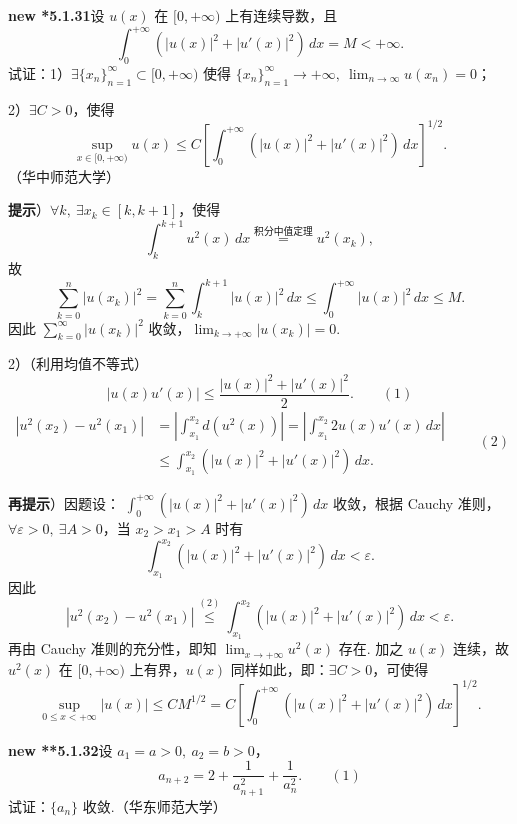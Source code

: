 \documentclass[UTF8,12pt,a4paper,fontset=fandol]{ctexart}
\begin{document}
\noindent\textbf{new *5.1.31}\quad 设 $u(x)$ 在 $[0,+\infty)$ 上有连续导数，且
\[
  \int_0^{+\infty}\left(|u(x)|^2+|u'(x)|^2\right)\,dx=M<+\infty.
\]
试证：1）$\exists\{x_n\}_{n=1}^{\infty}\subset[0,+\infty)$ 使得
$\{x_n\}_{n=1}^{\infty}\to+\infty,\ \lim_{n\to\infty}u(x_n)=0$；

2）$\exists C>0$，使得
\[
  \sup_{x\in[0,+\infty)}u(x)\le C\left[\int_0^{+\infty}\left(|u(x)|^2+|u'(x)|^2\right)\,dx\right]^{1/2}.
\]
（华中师范大学）

\noindent\textbf{提示}）$\forall k,\ \exists x_k\in[k,k+1]$，使得
\[
  \int_k^{k+1}u^2(x)\,dx
  \stackrel{\text{积分中值定理}}{=}u^2(x_k),
\]
故
\[
  \sum_{k=0}^n|u(x_k)|^2
  =\sum_{k=0}^n\int_k^{k+1}|u(x)|^2\,dx
  \le\int_0^{+\infty}|u(x)|^2\,dx\le M.
\]
因此 $\sum_{k=0}^{\infty}|u(x_k)|^2$ 收敛，$\lim_{k\to+\infty}|u(x_k)|=0$.

2）（利用均值不等式）
\[
  |u(x)u'(x)|\le\frac{|u(x)|^2+|u'(x)|^2}{2}.
\qquad(1)
\]
\begin{equation}
\begin{aligned}
|u^2(x_2)-u^2(x_1)|
&=\left|\int_{x_1}^{x_2}d(u^2(x))\right|
 =\left|\int_{x_1}^{x_2}2u(x)u'(x)\,dx\right|\\
&\le\int_{x_1}^{x_2}\left(|u(x)|^2+|u'(x)|^2\right)\,dx.
\end{aligned}
\qquad(2)
\end{equation}

\noindent\textbf{再提示}）因题设：
$\displaystyle\int_0^{+\infty}\left(|u(x)|^2+|u'(x)|^2\right)\,dx$ 收敛，根据 Cauchy 准则，
$\forall\varepsilon>0,\ \exists A>0$，当 $x_2>x_1>A$ 时有
\[
  \int_{x_1}^{x_2}\left(|u(x)|^2+|u'(x)|^2\right)\,dx<\varepsilon.
\]
因此
\[
  |u^2(x_2)-u^2(x_1)|\stackrel{(2)}{\le}
  \int_{x_1}^{x_2}\left(|u(x)|^2+|u'(x)|^2\right)\,dx<\varepsilon.
\]
再由 Cauchy 准则的充分性，即知 $\lim_{x\to+\infty}u^2(x)$ 存在. 加之 $u(x)$ 连续，故
$u^2(x)$ 在 $[0,+\infty)$ 上有界，$u(x)$ 同样如此，即：$\exists C>0$，可使得
\[
  \sup_{0\le x<+\infty}|u(x)|
  \le C M^{1/2}
  =C\left[\int_0^{+\infty}\left(|u(x)|^2+|u'(x)|^2\right)\,dx\right]^{1/2}.
\]

\noindent\textbf{new **5.1.32}\quad 设 $a_1=a>0,\ a_2=b>0$，
\[
  a_{n+2}=2+\frac1{a_{n+1}^2}+\frac1{a_n^2}.
\qquad(1)
\]
试证：$\{a_n\}$ 收敛.（华东师范大学）
\end{document}
